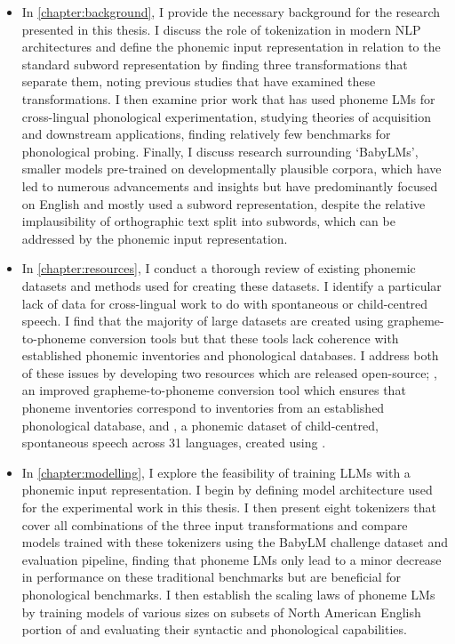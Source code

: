 \begin{itemize}
    \item In \cref{chapter:background}, I provide the necessary background for the research presented in this thesis. I discuss the role of tokenization in modern NLP architectures and define the phonemic input representation in relation to the standard subword representation by finding three transformations that separate them, noting previous studies that have examined these transformations. I then examine prior work that has used phoneme LMs for cross-lingual phonological experimentation, studying theories of acquisition and downstream applications, finding relatively few benchmarks for phonological probing. Finally, I discuss research surrounding `BabyLMs', smaller models pre-trained on developmentally plausible corpora, which have led to numerous advancements and insights but have predominantly focused on English and mostly used a subword representation, despite the relative implausibility of orthographic text split into subwords, which can be addressed by the phonemic input representation.
    \item In \cref{chapter:resources}, I conduct a thorough review of existing phonemic datasets and methods used for creating these datasets. I identify a particular lack of data for cross-lingual work to do with spontaneous or child-centred speech. I find that the majority of large datasets are created using grapheme-to-phoneme conversion tools but that these tools lack coherence with established phonemic inventories and phonological databases. I address both of these issues by developing two resources which are released open-source; \gpp, an improved grapheme-to-phoneme conversion tool which ensures that phoneme inventories correspond to inventories from an established phonological database, and \ipachildes, a phonemic dataset of child-centred, spontaneous speech across 31 languages, created using \gpp.
    \item In \cref{chapter:modelling}, I explore the feasibility of training LLMs with a phonemic input representation. I begin by defining model architecture used for the experimental work in this thesis. I then present eight tokenizers that cover all combinations of the three input transformations and compare models trained with these tokenizers using the BabyLM challenge dataset and evaluation pipeline, finding that phoneme LMs only lead to a minor decrease in performance on these traditional benchmarks but are beneficial for phonological benchmarks. I then establish the scaling laws of phoneme LMs by training models of various sizes on subsets of North American English portion of \ipachildes and evaluating their syntactic and phonological capabilities.

\end{itemize}
